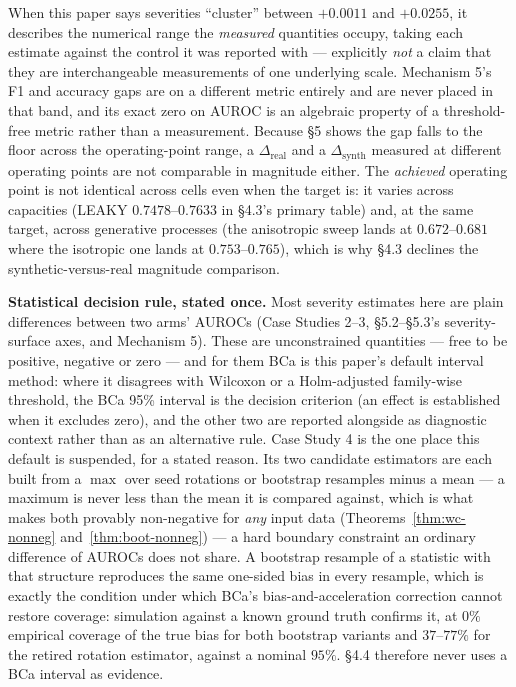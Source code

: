 \documentclass[10pt]{article} %
\begin{document}
When this paper says severities ``cluster'' between $+0.0011$ and $+0.0255$, it
describes the numerical range the \emph{measured} quantities occupy, taking
each estimate against the control it was reported with --- explicitly \emph{not}
a claim that they are interchangeable measurements of one underlying scale.
Mechanism 5's F1 and accuracy gaps are on a different metric entirely and are
never placed in that band, and its exact zero on AUROC is an algebraic property
of a threshold-free metric rather than a measurement. Because §5 shows the gap
falls to the floor across the operating-point range, a $\Delta_{\text{real}}$
and a $\Delta_{\text{synth}}$ measured at different operating points are not
comparable in magnitude either. The \emph{achieved} operating point is not
identical across cells even when the target is: it varies across capacities
(LEAKY $0.7478$--$0.7633$ in §4.3's primary table) and, at the same target,
across generative processes (the anisotropic sweep lands at $0.672$--$0.681$
where the isotropic one lands at $0.753$--$0.765$), which is why §4.3 declines
the synthetic-versus-real magnitude comparison.

\textbf{Statistical decision rule, stated once.} Most severity estimates here
are plain differences between two arms' AUROCs (Case Studies 2--3, §5.2--§5.3's
severity-surface axes, and Mechanism 5). These are unconstrained quantities ---
free to be positive, negative or zero --- and for them BCa is this paper's
default interval method: where it disagrees with Wilcoxon or a Holm-adjusted
family-wise threshold, the BCa 95\% interval is the decision criterion (an
effect is established when it excludes zero), and the other two are reported
alongside as diagnostic context rather than as an alternative rule. Case Study
4 is the one place this default is suspended, for a stated reason. Its two
candidate estimators are each built from a $\max$ over seed rotations or
bootstrap resamples minus a mean --- a maximum is never less than the mean it
is compared against, which is what makes both provably non-negative for
\emph{any} input data (Theorems~\ref{thm:wc-nonneg} and~\ref{thm:boot-nonneg})
--- a hard boundary constraint an ordinary difference of AUROCs does not share.
A bootstrap resample of a statistic with that structure reproduces the same
one-sided bias in every resample, which is exactly the condition under which
BCa's bias-and-acceleration correction cannot restore coverage: simulation
against a known ground truth confirms it, at $0\%$ empirical coverage of the
true bias for both bootstrap variants and $37$--$77\%$ for the retired rotation
estimator, against a nominal $95\%$. §4.4 therefore never uses a BCa interval
as evidence.
\end{document}
